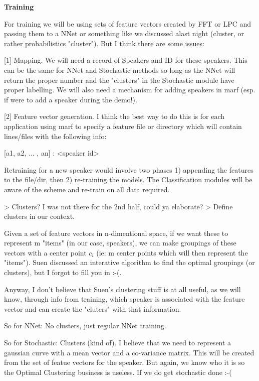 \noindent
{\bf Training}

For training we will be using sets of feature vectors created by FFT or
LPC and passing them to a NNet or something like we discussed alast night
(cluster, or rather probabilistics "cluster"). But I think there are some
issues:

[1] Mapping. We will need a record of Speakers and ID for these speakers.
This can be the same for NNet and Stochastic methods so long as the NNet
will return the proper number and the "clusters" in the Stochastic module have
proper labelling. We will also need a mechanism for adding speakers in
marf (esp. if were to add a speaker during the demo!).

[2] Feature vector generation. I think the best way to do this is for each
application using marf to specify a feature file or directory which will
contain lines/files with the following info:

[a1, a2, ... , an] : <speaker id>

Retraining for a new speaker would involve two phases 1) appending the
features to the file/dir, then 2) re-training the models. The
Classification modules will be aware of the scheme and re-train on all data
required.


> Clusters? I was not there for the 2nd half, could ya elaborate?
> Define clusters in our context.

Given a set of feature vectors in n-dimentional space, if we want these to
represent m "items" (in our case, speakers), we can make groupings of
these vectors with a center point $c_{i}$ (ie: m center points which will
then represent the "items"). Suen discussed an interative algorithm to find
the optimal groupings (or clusters), but I forgot to fill you in :-(.

Anyway, I don't believe that Suen's clustering stuff is at all useful, as
we will know, through info from training, which speaker is associated with
the feature vector and can create the "cluters" with that information.

So for NNet: No clusters, just regular NNet training.

So for Stochastic: Clusters (kind of). I believe that we need to represent
a gaussian curve with a mean vector and a co-variance matrix. This will be
created from the set of featue vectors for the speaker. But again, we know
who it is so the Optimal Clustering business is useless. If we do get
stochastic done :-(
